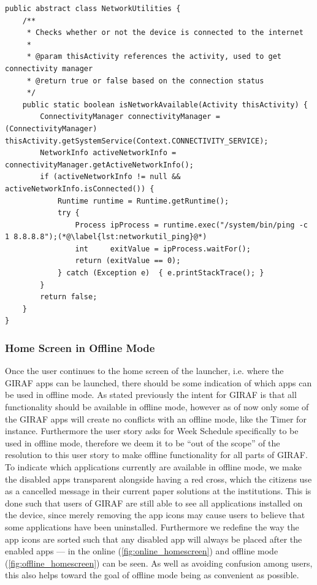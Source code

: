 \begin{lstlisting}[float, floatplacement=h!, caption={The class from the \texttt{giraf-component} library where network utilities are implemented, such as the method used to check if a connection to the internet is available}, label={lst:networkutil}]
public abstract class NetworkUtilities {
    /**
     * Checks whether or not the device is connected to the internet
     *
     * @param thisActivity references the activity, used to get connectivity manager
     * @return true or false based on the connection status
     */
    public static boolean isNetworkAvailable(Activity thisActivity) {
        ConnectivityManager connectivityManager = (ConnectivityManager) thisActivity.getSystemService(Context.CONNECTIVITY_SERVICE);
        NetworkInfo activeNetworkInfo = connectivityManager.getActiveNetworkInfo();
        if (activeNetworkInfo != null && activeNetworkInfo.isConnected()) {
            Runtime runtime = Runtime.getRuntime();
            try {
                Process ipProcess = runtime.exec("/system/bin/ping -c 1 8.8.8.8");(*@\label{lst:networkutil_ping}@*)
                int     exitValue = ipProcess.waitFor();
                return (exitValue == 0);
            } catch (Exception e)  { e.printStackTrace(); }
        }
        return false;
    }
}
\end{lstlisting}

\subsubsection{Home Screen in Offline Mode}
Once the user continues to the home screen of the launcher, i.e. where the GIRAF apps can be launched, there should be some indication of which apps can be used in offline mode. 
As stated previously the intent for GIRAF is that all functionality should be available in offline mode, however as of now only some of the GIRAF apps will create no conflicts with an offline mode, like the Timer for instance. 
Furthermore the user story asks for Week Schedule specifically to be used in offline mode, therefore we deem it to be \enquote{out of the scope} of the resolution to this user story to make offline functionality for all parts of GIRAF.
To indicate which applications currently are available in offline mode, we make the disabled apps transparent alongside having a red cross, which the citizens use as a cancelled message in their current paper solutions at the institutions.
This is done such that users of GIRAF are still able to see all applications installed on the device, since merely removing the app icons may cause users to believe that some applications have been uninstalled.
Furthermore we redefine the way the app icons are sorted such that any disabled app will always be placed after the enabled apps --- in  the online (\ref{fig:online_homescreen}) and offline mode (\ref{fig:offline_homescreen}) can be seen.
As well as avoiding confusion among users, this also helps toward the goal of offline mode being as convenient as possible.

